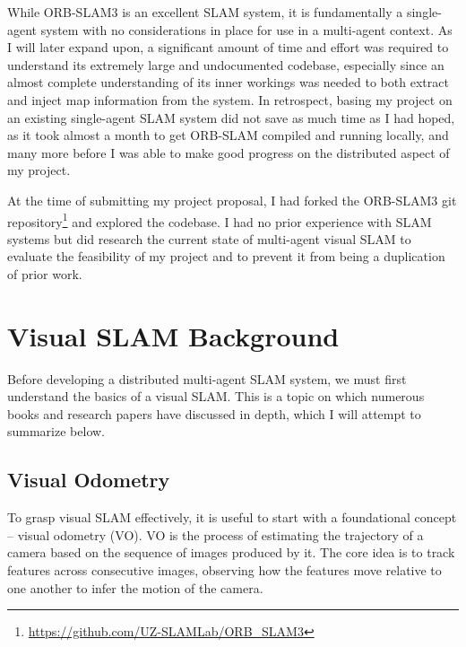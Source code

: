 While ORB-SLAM3 is an excellent SLAM system, it is fundamentally a single-agent system with no considerations in place for use in a multi-agent context. As I will later expand upon, a significant amount of time and effort was required to understand its extremely large and undocumented codebase, especially since an almost complete understanding of its inner workings was needed to both extract and inject map information from the system. In retrospect, basing my project on an existing single-agent SLAM system did not save as much time as I had hoped, as it took almost a month to get ORB-SLAM compiled and running locally, and many more before I was able to make good progress on the distributed aspect of my project.


At the time of submitting my project proposal, I had forked the ORB-SLAM3 git repository\footnote[1]{\url{https://github.com/UZ-SLAMLab/ORB_SLAM3}} and explored the codebase. I had no prior experience with SLAM systems but did research the current state of multi-agent visual SLAM to evaluate the feasibility of my project and to prevent it from being a duplication of prior work.


\section{Visual SLAM Background}
\label{sec:visual-slam-background}
Before developing a distributed multi-agent SLAM system, we must first understand the basics of a visual SLAM. This is a topic on which numerous books \autocite{gao2021introduction} \autocite{XiangGao} and research papers \autocite{durrant2006simultaneous} \autocite{taketomi2017visual} \autocite{10.1007} have discussed in depth, which I will attempt to summarize below. %

\subsection{Visual Odometry}
\label{sec:visual-slam-visual-odometry}
To grasp visual SLAM effectively, it is useful to start with a foundational concept – visual odometry (VO). VO is the process of estimating the trajectory of a camera based on the sequence of images produced by it. The core idea is to track features across consecutive images, observing how the features move relative to one another to infer the motion of the camera.

